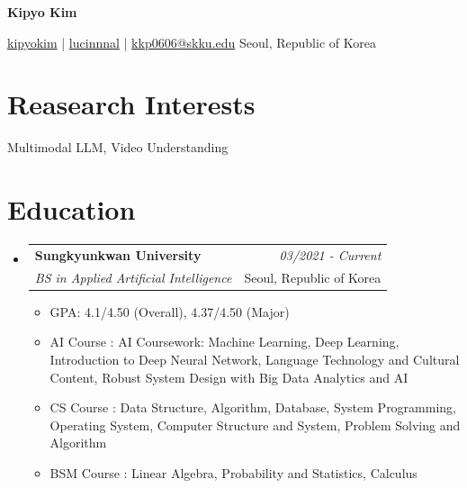 \documentclass[a4paper,11pt]{article}
\makeatletter
\newcommand{\resumeSubheading}[4]{
\vspace{0.5mm}\item
    \begin{tabular*}{0.98\textwidth}[t]{l@{\extracolsep{\fill}}r}
        \textbf{#1} & \textit{\footnotesize{#4}} \\
        \textit{\footnotesize{#3}} &  \footnotesize{#2}\\
    \end{tabular*}
    \vspace{-2.4mm}
}
\newcommand{\resumeSubHeadingListStart}{\begin{itemize}[leftmargin=*,labelsep=1mm]}
\newcommand{\resumeItemListStart}{\begin{itemize}[leftmargin=*,labelsep=1mm,itemsep=0.5mm]}
\newcommand{\resumeSubHeadingListEnd}{\end{itemize}\vspace{2mm}}
\newcommand{\resumeItemListEnd}{\end{itemize}\vspace{-2mm}}
\newcommand{\socialicon}[1]{\raisebox{-0.05em}{\resizebox{!}{1em}{#1}}}
\newcommand{\headerfontiii}{\fontfamily{ppl}\selectfont} %
\makeatother
\begin{document}
\headerfontiii

\begin{center}
    {\Huge\textbf{Kipyo Kim}}
\end{center}
\vspace{-6mm}

\vspace{2mm}

\begin{center}
    \small{
    \socialicon{\faLinkedin} \href{https://www.linkedin.com/in/kipyokim/}{kipyokim} | 
    \socialicon{\faGithub} \href{https://github.com/lucinnnal}{lucinnnal} |
    \socialicon{\faEnvelope} 
    \href{mailto:kkp0606@skku.edu}{kkp0606@skku.edu}
    \socialicon{\faMapMarker}  Seoul, Republic of Korea
    }
\end{center}

\vspace{-3mm}

\section{\textbf{Reasearch Interests}}
\vspace{1mm}
\small{
Multimodal LLM, Video Understanding
}
\vspace{-1mm}

\section{\textbf{Education}}
\vspace{-0.4mm}
\resumeSubHeadingListStart

\resumeSubheading
{Sungkyunkwan University}{Seoul, Republic of Korea}
{BS in Applied Artificial Intelligence}{03/2021 - Current}
\resumeItemListStart
\item GPA: 4.1/4.50 (Overall), 4.37/4.50 (Major)
\item AI Course : AI Coursework: Machine Learning, Deep Learning, Introduction to Deep Neural Network, Language Technology and Cultural Content, Robust System Design with Big Data Analytics and AI
\item CS Course : Data Structure, Algorithm, Database, System Programming, Operating System, Computer Structure and
System, Problem Solving and Algorithm
\item BSM Course : Linear Algebra, Probability and Statistics, Calculus
\resumeItemListEnd

\resumeSubHeadingListEnd
\vspace{-5mm}
\end{document}
